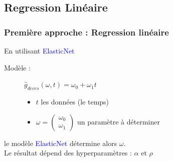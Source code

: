 \documentclass{beamer}[aspectratio = 43]
\begin{document}
\subsection{Regression Linéaire}
\begin{frame}
	\frametitle{Première approche : Regression linéaire}
	En utilisant \textcolor{blue}{ElasticNet} %
	
	\vspace{0.23 cm}
	Modèle :
	\begin{figure}[h]
		\begin{minipage}{0.35\textwidth}
			$\hat{g}_{deces} (\omega,t) =\omega_{0} +  \omega_{1} t$
		\end{minipage}%
		\begin{minipage}{0.65\textwidth}
			\begin{itemize}
				\item[] $t$ les données (le temps)
				\item[] 
				$\omega = 
				\begin{pmatrix}
					\omega_{0} \\
					\omega_{1}
				\end{pmatrix}$ un paramètre à déterminer
			\end{itemize}
		\end{minipage}
	\end{figure}
	\vspace{20pt}
	le modèle \textcolor{blue}{ElasticNet} détermine alors $\omega$.\\
	Le résultat dépend des hyperparamètres : $\alpha$ et $\rho$
	

\end{frame}
\end{document}
